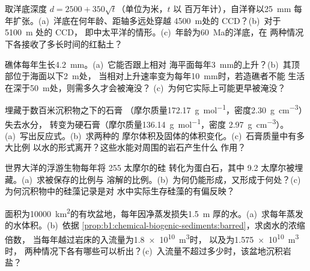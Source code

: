 \begin{exercise}[$\star\star$]\label{exo:b1:chemical-biogenic-sediments:6}
取洋底深度 $d = 2500 + 350\sqrt t$（单位为米，$t$ 以
百万年计），自洋脊以\qty{25}{mm}
每年扩张。(a)~洋底在何年龄、距轴多远处穿越
\qty{4500}{m}处的 CCD？(b)~对于 \qty{5100}{m} 处的 CCD，
即中太平洋的情形。(c)~年龄为\qty{60}{Ma}的洋底，在
两种情况下各接收了多长时间的红黏土？
\end{exercise}

\begin{exercise}[$\star\star$]\label{exo:b1:chemical-biogenic-sediments:7}
礁体每年生长\qty{4.2}{mm}。(a)~它能否跟上相对
海平面每年\qty{3}{mm}的上升？(b)~其顶部位于海面以下\qty{2}{m}处，
当相对上升速率变为每年\qty{10}{mm}时，若造礁者不能
生活在深于\qty{50}{m}处，则需多久才会被淹没？
(c)~为何它实际上可能更早被淹没？
\end{exercise}

\begin{exercise}[$\star\star$]\label{exo:b1:chemical-biogenic-sediments:8}
埋藏于数百米沉积物之下的石膏
（摩尔质量\qty{172.17}{g.mol^{-1}}，密度\qty{2.30}{g.cm^{-3}}）失去水分，
转变为硬石膏（摩尔质量\qty{136.14}{g.mol^{-1}}，密度
\qty{2.97}{g.cm^{-3}}）。(a)~写出反应式。(b)~求两种的
摩尔体积及固体的体积变化。(c)~石膏质量中有多大比例
以水的形式离开？这些水能对周围的岩石产生什么
作用？
\end{exercise}

\begin{exercise}[$\star\star$]\label{exo:b1:chemical-biogenic-sediments:9}
世界大洋的浮游生物每年将 255 太摩尔的硅
转化为蛋白石，其中 9.2 太摩尔被埋藏。(a)~求被保存的比例与
溶解的比例。(b)~为何仍能形成，又形成于何处？(c)~
为何沉积物中的硅藻记录是对
水中实际生存硅藻的有偏反映？
\end{exercise}

\begin{exercise}[$\star\star\star$]\label{exo:b1:chemical-biogenic-sediments:10}
面积为\qty{10000}{km^2}的有坎盆地，每年因净蒸发损失\qty{1.5}{m}
厚的水。(a)~求每年蒸发的水体积。(b)~依据
\cref{prop:b1:chemical-biogenic-sediments:barred}，求卤水的浓缩倍数，
当每年越过岩床的入流量为\qty{1.8e10}{m^3}时，
以及为\qty{1.575e10}{m^3}时，
两种情况下各有哪些可以析出？(c)~入流量不超过多少时，该盆地沉积岩盐？
\end{exercise}

